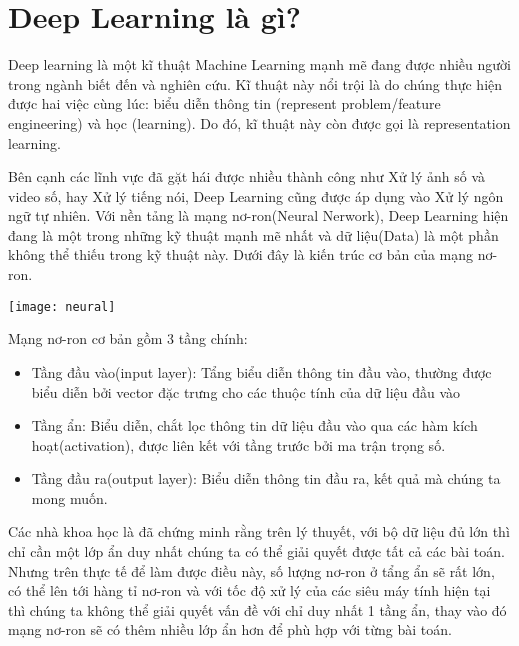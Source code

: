 \section{Deep Learning là gì?}
Deep learning là một kĩ thuật Machine Learning mạnh mẽ đang được nhiều người trong ngành biết đến và nghiên cứu. Kĩ thuật này nổi trội là do chúng thực hiện được hai việc cùng lúc: biểu diễn thông tin (represent problem/feature engineering) và học (learning). Do đó, kĩ thuật này còn được gọi là representation learning.

Bên cạnh các lĩnh vực đã gặt hái được nhiều thành công như Xử lý ảnh số và video số, hay Xử lý tiếng nói, Deep Learning cũng được áp dụng vào Xử lý ngôn ngữ tự nhiên. Với nền tảng là mạng nơ-ron(Neural Nerwork), Deep Learning hiện đang là một trong những kỹ thuật mạnh mẽ nhất và dữ liệu(Data) là một phần không thể thiếu trong kỹ thuật này. Dưới đây là kiến trúc cơ bản của mạng nơ-ron.\\
	\begin{center}
	  \texttt{[image: neural]}
	  \label{neural}
	\end{center}
Mạng nơ-ron cơ bản gồm 3 tầng chính:
	\begin{itemize}[label = \textbullet]
		\item Tầng đầu vào(input layer): Tẩng biểu diễn thông tin đầu vào, thường được biểu diễn bởi vector đặc trưng cho các thuộc tính của dữ liệu đầu vào
		\item Tầng ẩn: Biểu diễn, chắt lọc thông tin dữ liệu đầu vào qua các hàm kích hoạt(activation), được liên kết với tầng trước bởi ma trận trọng số.
		\item Tầng đầu ra(output layer): Biểu diễn thông tin đầu ra, kết quả mà chúng ta mong muốn.
	\end{itemize}
Các nhà khoa học là đã chứng minh rằng trên lý thuyết, với bộ dữ liệu đủ lớn thì chỉ cần một lớp ẩn duy nhất chúng ta có thể giải quyết được tất cả các bài toán. Nhưng trên thực tế để làm được điều này, số lượng nơ-ron ở tẩng ẩn sẽ rất lớn, có thể lên tới hàng tỉ nơ-ron và với tốc độ xử lý của các siêu máy tính hiện tại thì chúng ta không thể giải quyết vấn đề với chỉ duy nhất 1 tầng ẩn, thay vào đó mạng nơ-ron sẽ có thêm nhiều lớp ẩn hơn để phù hợp với từng bài toán.

 



